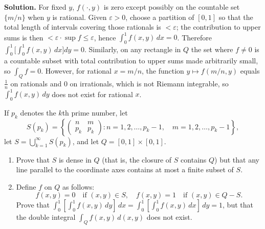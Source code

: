 \noindent\textbf{Solution.}
For fixed $y$, $f(\cdot,y)$ is zero except possibly on the countable set $\{m/n\}$ when $y$ is rational. Given $\varepsilon>0$, choose a partition of $[0,1]$ so that the total length of intervals covering those rationals is $<\varepsilon$; the contribution to upper sums is then $<\varepsilon\cdot\sup f\le \varepsilon$, hence $\int_0^1 f(x,y)\,dx=0$. Therefore $\int_0^1\!\Big[\int_0^1 f(x,y)\,dx\Big]dy=0$.
Similarly, on any rectangle in $Q$ the set where $f\ne 0$ is a countable subset with total contribution to upper sums made arbitrarily small, so $\int_Q f=0$. However, for rational $x=m/n$, the function $y\mapsto f(m/n,y)$ equals $\tfrac{1}{n}$ on rationals and $0$ on irrationals, which is not Riemann integrable, so $\int_0^1 f(x,y)\,dy$ does not exist for rational $x$.

\begin{problembox}
If \( p_k \) denotes the \( k \)th prime number, let
\[S(p_k) = \left\{ \begin{pmatrix}
n & m \\
p_k & p_k
\end{pmatrix} : n = 1, 2, \ldots, p_k - 1, \quad m = 1, 2, \ldots, p_k - 1 \right\},\]
let \( S = \bigcup_{k=1}^{\infty} S(p_k) \), and let \( Q = [0, 1] \times [0, 1] \).

\begin{enumerate}[label=(\alph*)]
    \item Prove that \( S \) is dense in \( Q \) (that is, the closure of \( S \) contains \( Q \)) but that any line parallel to the coordinate axes contains at most a finite subset of \( S \).
    
    \item Define \( f \) on \( Q \) as follows:
    \[f(x, y) = 0 \quad \text{if } (x, y) \in S, \quad f(x, y) = 1 \quad \text{if } (x, y) \in Q - S.\]
    Prove that \( \int_{0}^{1} \left[ \int_{0}^{1} f(x, y) \, dy \right] \, dx = \int_{0}^{1} \left[ \int_{0}^{1} f(x, y) \, dx \right] \, dy = 1 \), but that the double integral \( \int_{Q} f(x, y) \, d(x, y) \) does not exist.
\end{enumerate}
\end{problembox}

